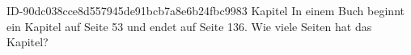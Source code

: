 \begin{exercise}
      {ID-90dc038cce8d557945de91bcb7a8e6b24fbc9983}
      {Kapitel}
  \ifproblem\problem
    In einem Buch beginnt ein Kapitel auf Seite 53 und endet auf Seite 136.
    Wie viele Seiten hat das Kapitel?
  \fi
\end{exercise}

